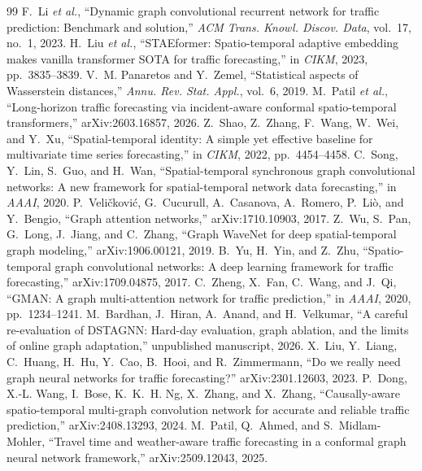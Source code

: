 \documentclass[conference]{IEEEtran}
\begin{document}
\begin{thebibliography}{99}
 F.~Li \emph{et al.}, ``Dynamic graph convolutional recurrent network for traffic prediction: Benchmark and solution,'' \emph{ACM Trans. Knowl. Discov. Data}, vol.~17, no.~1, 2023.
 H.~Liu \emph{et al.}, ``{STAEformer}: Spatio-temporal adaptive embedding makes vanilla transformer {SOTA} for traffic forecasting,'' in \emph{CIKM}, 2023, pp.~3835--3839.
 V.~M. Panaretos and Y.~Zemel, ``Statistical aspects of Wasserstein distances,'' \emph{Annu. Rev. Stat. Appl.}, vol.~6, 2019.
 M.~Patil \emph{et al.}, ``Long-horizon traffic forecasting via incident-aware conformal spatio-temporal transformers,'' arXiv:2603.16857, 2026.
 Z.~Shao, Z.~Zhang, F.~Wang, W.~Wei, and Y.~Xu, ``Spatial-temporal identity: A simple yet effective baseline for multivariate time series forecasting,'' in \emph{CIKM}, 2022, pp.~4454--4458.
 C.~Song, Y.~Lin, S.~Guo, and H.~Wan, ``Spatial-temporal synchronous graph convolutional networks: A new framework for spatial-temporal network data forecasting,'' in \emph{AAAI}, 2020.
 P.~Veli{\v c}kovi{\'c}, G.~Cucurull, A.~Casanova, A.~Romero, P.~Li{\`o}, and Y.~Bengio, ``Graph attention networks,'' arXiv:1710.10903, 2017.
 Z.~Wu, S.~Pan, G.~Long, J.~Jiang, and C.~Zhang, ``Graph {WaveNet} for deep spatial-temporal graph modeling,'' arXiv:1906.00121, 2019.
 B.~Yu, H.~Yin, and Z.~Zhu, ``Spatio-temporal graph convolutional networks: A deep learning framework for traffic forecasting,'' arXiv:1709.04875, 2017.
 C.~Zheng, X.~Fan, C.~Wang, and J.~Qi, ``{GMAN}: A graph multi-attention network for traffic prediction,'' in \emph{AAAI}, 2020, pp.~1234--1241.
 M.~Bardhan, J.~Hiran, A.~Anand, and H.~Velkumar, ``A careful re-evaluation of {DSTAGNN}: Hard-day evaluation, graph ablation, and the limits of online graph adaptation,'' unpublished manuscript, 2026.
 X.~Liu, Y.~Liang, C.~Huang, H.~Hu, Y.~Cao, B.~Hooi, and R.~Zimmermann, ``Do we really need graph neural networks for traffic forecasting?'' arXiv:2301.12603, 2023.
 P.~Dong, X.-L. Wang, I.~Bose, K.~K.~H. Ng, X.~Zhang, and X.~Zhang, ``Causally-aware spatio-temporal multi-graph convolution network for accurate and reliable traffic prediction,'' arXiv:2408.13293, 2024.
 M.~Patil, Q.~Ahmed, and S.~Midlam-Mohler, ``Travel time and weather-aware traffic forecasting in a conformal graph neural network framework,'' arXiv:2509.12043, 2025.

\end{thebibliography}
\end{document}

